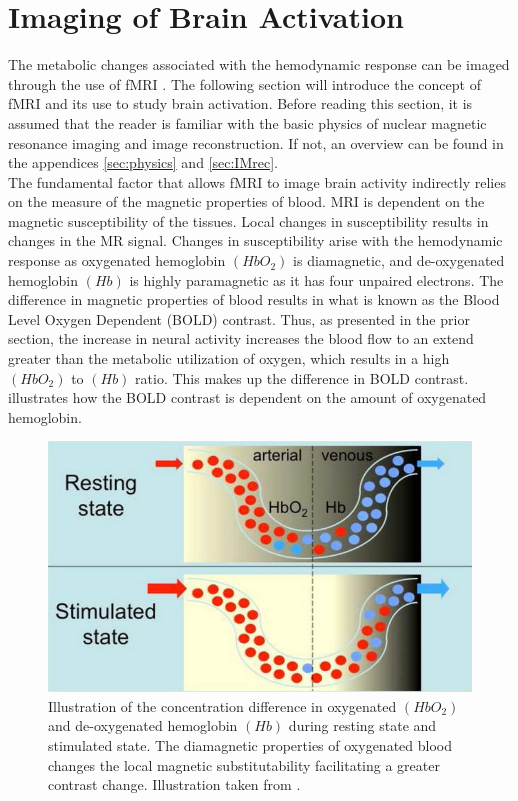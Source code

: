 
\section{Imaging of Brain Activation}

The metabolic changes associated with the hemodynamic response can be imaged through the use of fMRI \cite{Glover2011}. The following section will introduce the concept of fMRI and its use to study brain activation. Before reading this section, it is assumed that the reader is familiar with the basic physics of nuclear magnetic resonance imaging and image reconstruction. If not, an overview can be found in the appendices \ref{sec:physics} and \ref{sec:IMrec}. \\
The fundamental factor that allows fMRI to image brain activity indirectly relies on the measure of the magnetic properties of blood. MRI is dependent on the magnetic susceptibility of the tissues. Local changes in susceptibility results in changes in the MR signal. \cite{Syed2015} Changes in susceptibility arise with the hemodynamic response as oxygenated hemoglobin $(HbO_2)$ is diamagnetic, and de-oxygenated hemoglobin $(Hb)$ is highly paramagnetic as it has four unpaired electrons. The difference in magnetic properties of blood results in what is known as the Blood Level Oxygen Dependent (BOLD) contrast. Thus, as presented in the prior section, the increase in neural activity increases the blood flow to an extend greater than the metabolic utilization of oxygen, which results in a high $(HbO_2)$ to $(Hb)$ ratio. This makes up the difference in BOLD contrast. \cite{Glover2011,Poldrack2011,Khanna2015}  illustrates how the BOLD contrast is dependent on the amount of oxygenated hemoglobin. 

\begin{figure}[H]                 
	\includegraphics[width=.47\textwidth]{figures/aBackground/bold_response}  
	\caption{Illustration of the concentration difference in oxygenated $(HbO_2)$ and de-oxygenated hemoglobin $(Hb)$ during resting state and stimulated state. The diamagnetic properties of oxygenated blood changes the local magnetic substitutability facilitating a greater contrast change. Illustration taken from \cite{Glover2011}.}
	\label{fig:back:bold} 
\end{figure}


